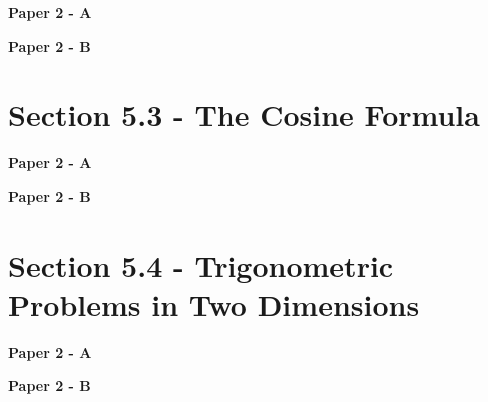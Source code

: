 \documentclass[12pt, a4paper]{article}
\begin{document}
\textbf{Paper 2 - A}
\begin{enumx}[label=\arabic*.,start=2]
\item {}\label{DSE2012S-CoreP2-Q24} 
\end{enumx}
\textbf{Paper 2 - B}
\begin{enumx}[label=\arabic*.,start=3]
\item {}\label{DSE2012S-CoreP2-Q38} 
\end{enumx}




\section*{Section 5.3 - The Cosine Formula \NF}\label{section:5-5-3}

\textbf{Paper 2 - A}
\begin{enumx}[label=\arabic*.,start=4]
\item {}\label{DSE2013-CoreP2-Q22} 
\item {}\label{DSE2017-CoreP2-Q25} 
\end{enumx}
\textbf{Paper 2 - B}
\begin{enumx}[label=\arabic*.,start=6]
\item {}\label{DSE2017-CoreP2-Q38} 
\end{enumx}




\section*{Section 5.4 - Trigonometric Problems in Two Dimensions \NF}\label{section:5-5-4}

\textbf{Paper 2 - A}
\begin{enumx}[label=\arabic*.,start=7]
\item {}\label{DSE2022-CoreP2-Q16} 
\item {}\label{DSE2022-CoreP2-Q17} 
\end{enumx}
\textbf{Paper 2 - B}
\begin{enumx}[label=\arabic*.,start=9]
\item {}\label{DSE2021-CoreP2-Q38} 
\end{enumx}
\end{document}

